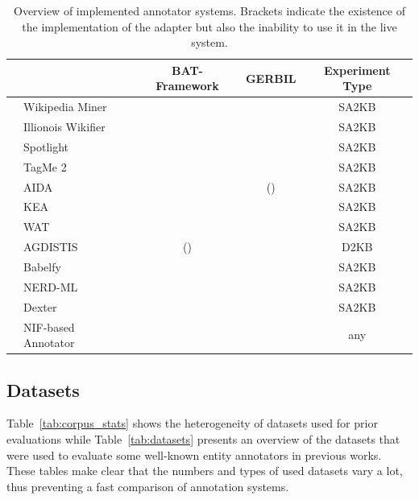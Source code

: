 \begin{table}[htb!]
\centering
\begin{tabular}{llccc}
\toprule
                                        && \textbf{BAT-Framework}           & \textbf{GERBIL}                    & \textbf{Experiment Type}\\
\midrule
\cite{milne2008learning}		&Wikipedia Miner	& \haken 					& \haken	&	SA2KB\\
\cite{rat:rot}							&Illionois Wikifier	& \haken 					& \haken 	& 	SA2KB\\
\cite{spotlight}						&Spotlight           	& \haken                 & \haken  & SA2KB\\
\cite{TagMe2}						&TagMe 2           	& \haken                 & \haken	& SA2KB\\
\cite{AIDA}							&AIDA                	& \haken                 & (\haken)	& SA2KB\\
\cite{Steinmetz2013}			&KEA                	&                         		& \haken	& SA2KB\\
\cite{piccinno2014tagme}	&WAT            		&                         		& \haken 	& SA2KB\\
\cite{agdistis_iswc}				&AGDISTIS           & (\haken)               & \haken	& D2KB\\
\cite{babelfy}						&Babelfy              &                         		& \haken	& SA2KB\\
\cite{rizzo2014}					&NERD-ML          	&                         		& \haken 	& SA2KB\\
\cite{ceccarelli2013dexter}	&Dexter 				&          					& \haken 	& SA2KB\\
											&NIF-based Annotator       &             	& \haken  & any\\
\bottomrule
\end{tabular}
\caption{Overview of implemented annotator systems. Brackets indicate the existence of the implementation of the adapter but also the inability to use it in the live system.}
\label{tab:annotator}
\end{table}

\subsection{Datasets}
\label{sec:datasets}

Table~\ref{tab:corpus_stats} shows the heterogeneity of datasets used for prior evaluations while Table~\ref{tab:datasets} presents an overview of the datasets that were used to evaluate some well-known entity annotators in previous works.
These tables make clear that the numbers and types of used datasets vary a lot, thus preventing a fast comparison of annotation systems.

